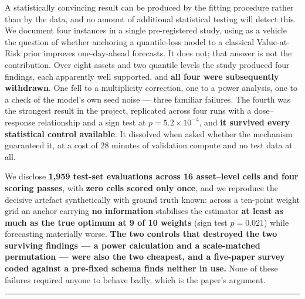 A statistically convincing result can be produced by the fitting procedure rather than by the
data, and no amount of additional statistical testing will detect this. We document four
instances in a single pre-registered study, using as a vehicle the question of whether anchoring
a quantile-loss model to a classical Value-at-Risk prior improves one-day-ahead forecasts. It
does not; that answer is not the contribution. Over eight assets and two quantile levels the
study produced four findings, each apparently well supported, and \textbf{all four were subsequently
withdrawn}. One fell to a multiplicity correction, one to a power analysis, one to a check of
the model's own seed noise --- three familiar failures. The fourth was the strongest result in the
project, replicated across four runs with a dose--response relationship and a sign test at
\(p = 5.2 \times 10^{-4}\), and \textbf{it survived every statistical control available}. It dissolved when asked
whether the mechanism guaranteed it, at a cost of 28 minutes of validation compute and no test
data at all.

We disclose \textbf{1,959 test-set evaluations across 16 asset--level cells and four scoring passes},
with \textbf{zero cells scored only once}, and we reproduce the decisive artefact synthetically with
ground truth known: across a ten-point weight grid an anchor carrying \textbf{no information}
stabilises the estimator \textbf{at least as much as the true optimum at 9 of 10 weights}
(sign test \(p = 0.021\)) while forecasting materially worse. \textbf{The two controls that destroyed the
two surviving findings --- a power calculation and a scale-matched permutation --- were also the two
cheapest, and a five-paper survey coded against a pre-fixed schema finds neither in use.} None
of these failures required anyone to behave badly, which is the paper's argument.

\begin{center}\rule{0.5\linewidth}{0.5pt}\end{center}
